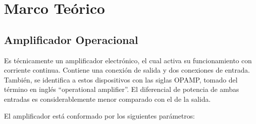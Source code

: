 \section{Marco Teórico}

    \subsection{Amplificador Operacional}

        Es técnicamente un amplificador electrónico, el cual activa su funcionamiento con corriente continua. Contiene una conexión de salida y dos conexiones de entrada. También, se identifica a estos dispositivos con las siglas OPAMP, tomado del término en inglés “operational amplifier”. El diferencial de potencia de ambas entradas es considerablemente menor comparado con el de la salida. 
        
        El amplificador está conformado por los siguientes parámetros:

